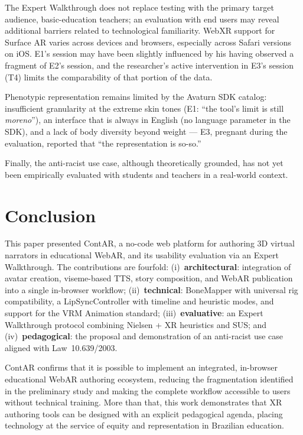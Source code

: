 \documentclass[conference]{IEEEtran}
\begin{document}
The Expert Walkthrough does not replace testing with the primary target
audience, basic-education teachers; an evaluation with end users may reveal
additional barriers related to technological familiarity. WebXR support for
Surface AR varies across devices and browsers, especially across Safari
versions on iOS. E1's session may have been slightly influenced by his having
observed a fragment of E2's session, and the researcher's active intervention
in E3's session (T4) limits the comparability of that portion of the data.

Phenotypic representation remains limited by the Avaturn SDK catalog:
insufficient granularity at the extreme skin tones (E1: ``the tool's limit is
still \textit{moreno}''), an interface that is always in English (no language
parameter in the SDK), and a lack of body diversity beyond weight --- E3,
pregnant during the evaluation, reported that ``the representation is
so-so.''

Finally, the anti-racist use case, although theoretically grounded, has not
yet been empirically evaluated with students and teachers in a real-world
context.

\section{Conclusion}

This paper presented ContAR, a no-code web platform for authoring 3D virtual
narrators in educational WebAR, and its usability evaluation via an Expert
Walkthrough. The contributions are fourfold: (i)~\textbf{architectural}:
integration of avatar creation, viseme-based TTS, story composition, and
WebAR publication into a single in-browser workflow; (ii)~\textbf{technical}:
BoneMapper with universal rig compatibility, a LipSyncController with
timeline and heuristic modes, and support for the VRM Animation standard;
(iii)~\textbf{evaluative}: an Expert Walkthrough protocol combining Nielsen +
XR heuristics and SUS; and (iv)~\textbf{pedagogical}: the proposal and
demonstration of an anti-racist use case aligned with Law~10.639/2003.

ContAR confirms that it is possible to implement an integrated, in-browser
educational WebAR authoring ecosystem, reducing the fragmentation identified
in the preliminary study and making the complete workflow accessible to
users without technical training. More than that, this work demonstrates
that XR authoring tools can be designed with an explicit pedagogical agenda,
placing technology at the service of equity and representation in Brazilian
education.
\end{document}
